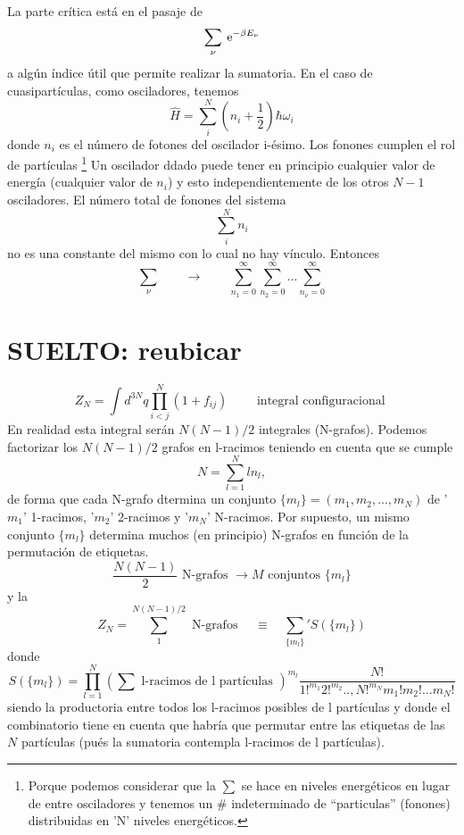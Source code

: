 \documentclass[10pt,oneside]{CBFT_book}
\begin{document}
La parte crítica está en el pasaje de 
\[
	\sum_\nu \:\mathrm{e}^{ -\beta E_\nu }
\]
a algún índice útil que permite realizar la sumatoria. En el caso de cuasipartículas, como osciladores, 
tenemos
\[
	\hat{H} = \sum_i^N \left( n_i + \frac{1}{2} \right) \hbar \omega_i 
\]
donde $ n_i $ es el número de fotones del oscilador i-ésimo. Los fonones cumplen el rol de partículas
\footnote{Porque podemos considerar que la $\sum$ se hace en niveles energéticos en lugar de entre osciladores
y tenemos un \# indeterminado de ``particulas'' (fonones) distribuidas en 'N' niveles energéticos.}
Un oscilador ddado puede tener en principio cualquier valor de energía (cualquier valor de $ n_i $) y esto 
independientemente de los otros $ N-1 $ osciladores. El número total de fonones del sistema
\[
	\sum_i^N n_i
\]
no es una constante del mismo con lo cual no hay vínculo. Entonces
\[
	\sum_\nu \qquad \rightarrow \qquad \sum_{n_1=0}^\infty \sum_{n_2=0}^\infty ... \sum_{n_\nu=0}^\infty
\]


\section{SUELTO: reubicar}

\[
	Z_N = \int d^{3N}q \prod_{i<j}^N (1+f_{ij}) \qquad \text{ integral configuracional }
\]
En realidad esta integral serán $ N(N-1)/2 $ integrales (N-grafos). Podemos factorizar los $ N(N-1)/2 $ grafos
en l-racimos teniendo en cuenta que se cumple
\[
	N = \sum_{l=1}^N ln_l,
\]
de forma que cada N-grafo dtermina un conjunto $ \{ m_l \} = (m_1,m_2, ..., m_N) $ de '$m_1$' 1-racimos, '$m_2$' 
2-racimos y '$m_N$' N-racimos. Por supuesto, un mismo conjunto $ \{ m_l \} $ determina muchos (en principio) N-grafos 
en función de la permutación de etiquetas.
\[
	\frac{N(N-1)}{2} \text{ N-grafos } \rightarrow M \text{ conjuntos } \{ m_l \}
\]
y la 
\[
	Z_N = \sum_1^{N(N-1)/2 } \text{ N-grafos } \quad \equiv \quad \sum_ {\{ m_l \}}' S(\{ m_l \})
\]
donde 
\[
	S(\{ m_l \}) = \prod_{l=1}^N \left( \sum \text{ l-racimos de l partículas }\right)^{m_l}
	\frac{N!}{ 1!^{m_1} 2!^{m_2} ..,N!^{m_N} m_1! m_2! ... m_N!}
\]
siendo la productoria entre todos los l-racimos posibles de l partículas y donde el combinatorio tiene en cuenta que 
habría que permutar entre las etiquetas de las $N$ partículas (pués la sumatoria contempla l-racimos de l partículas).
\end{document}

